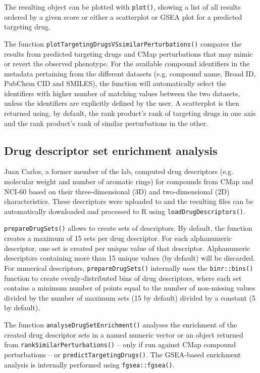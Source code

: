 The resulting object can be plotted with \texttt{plot()}, showing a list of all results ordered by a given score or either a scatterplot or GSEA plot for a predicted targeting drug.

The function \texttt{plotTargetingDrugsVSsimilarPerturbations()} compares the results from predicted targeting drugs and CMap perturbations that may mimic or revert the observed phenotype. For the available compound identifiers in the metadata pertaining from the different datasets (e.g. compound name, Broad ID, PubChem CID and SMILES), the function will automatically select the identifiers with higher number of matching values between the two datasets, unless the identifiers are explicitly defined by the user. A scatterplot is then returned using, by default, the rank product’s rank of targeting drugs in one axis and the rank product’s rank of similar perturbations in the other.

\subsection{Drug descriptor set enrichment analysis}

Juan Carlos, a former member of the lab, computed drug descriptors (e.g. molecular weight and number of aromatic rings) for compounds from CMap and NCI-60 based on their three-dimensional (3D) and two-dimensional (2D) characteristics. These descriptors were uploaded to  and the resulting files can be automatically downloaded and processed to R using \texttt{loadDrugDescriptors()}.

\texttt{prepareDrugSets()} allows to create sets of descriptors. By default, the function creates a maximum of 15 sets per drug descriptor. For each alphanumeric descriptor, one set is created per unique value of that descriptor. Alphanumeric descriptors containing more than 15 unique values (by default) will be discarded. For numerical descriptors, \texttt{prepareDrugSets()} internally uses the \texttt{binr::bins()} function to create evenly-distributed bins of drug descriptors, where each set contains a minimum number of points equal to the number of non-missing values divided by the number of maximum sets (15 by default) divided by a constant (5 by default).

The function \texttt{analyseDrugSetEnrichment()} analyses the enrichment of the created drug descriptor sets in a named numeric vector or an object returned from \texttt{rankSimilarPerturbations()} – only if run against CMap compound perturbations – or \texttt{predictTargetingDrugs()}. The GSEA-based enrichment analysis is internally performed using \texttt{fgsea::fgsea()}.

